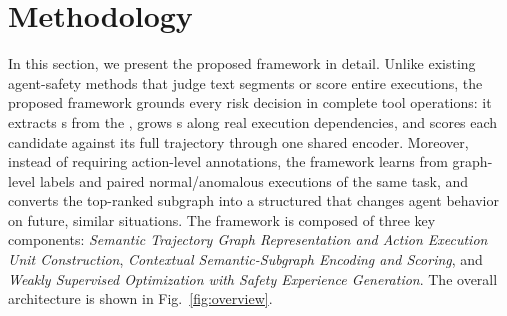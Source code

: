 \section{Methodology}
\label{sec:method}

In this section, we present the proposed framework in detail. Unlike existing agent-safety methods that judge text segments or score entire executions, the proposed framework grounds every risk decision in complete tool operations: it extracts \aeu{}s from the \stg{}, grows \csg{}s along real execution dependencies, and scores each candidate against its full trajectory through one shared encoder. Moreover, instead of requiring action-level annotations, the framework learns from graph-level labels and paired normal/anomalous executions of the same task, and converts the top-ranked subgraph into a structured \sexp{} that changes agent behavior on future, similar situations. The framework is composed of three key components: \emph{Semantic Trajectory Graph Representation and Action Execution Unit Construction}, \emph{Contextual Semantic-Subgraph Encoding and Scoring}, and \emph{Weakly Supervised Optimization with Safety Experience Generation}. The overall architecture is shown in Fig.~\ref{fig:overview}.

